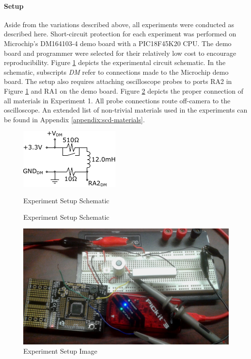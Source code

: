 \paragraph{Setup}
Aside from the variations described above, all experiments were conducted as described here. Short-circuit protection for each experiment was performed on Microchip's DM164103-4 demo board with a PIC18F45K20 CPU. The demo board and programmer were selected for their relatively low cost to encourage reproducibility. 
Figure \ref{fig:ExperimentSetup} depicts the experimental circuit schematic. In the schematic, subscripts \textit{DM} refer to connections made to the Microchip demo board. The setup also requires attaching oscilloscope probes to ports RA2 in Figure \ref{fig:ExperimentSetup} and RA1 on the demo board. Figure \ref{fig:Experiment1Setup} depicts the proper connection of all materials in Experiment 1. All probe connections route off-camera to the oscilloscope. An extended list of non-trivial materials used in the experiments can be found in Appendix \ref{appendix:scd-materials}.
\begin{figure}
    \centering
    \includegraphics[width=0.45\linewidth]{img/Experiment_Setup.pdf}
    \caption{Experiment Setup Schematic} Experiment Setup Schematic
    \label{fig:ExperimentSetup}
\end{figure}

\begin{figure}
    \centering
    \includegraphics[width=0.75\linewidth]{img/SCD_5_9mH_EXP_SETUP.jpg}
    \caption{Experiment Setup Image}
    \label{fig:Experiment1Setup}
\end{figure}

